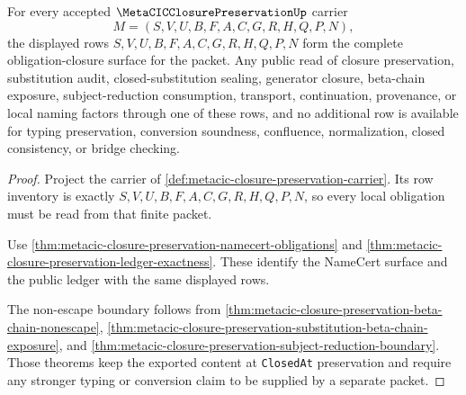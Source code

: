 \begin{theorem}
\label{thm:metacic-closure-preservation-obligation-closure}
For every accepted $\MetaCICClosurePreservationUp$ carrier
$$
M=(S,V,U,B,F,A,C,G,R,H,Q,P,N),
$$
the displayed rows $S,V,U,B,F,A,C,G,R,H,Q,P,N$ form the complete obligation-closure surface for the packet. Any public read of closure preservation, substitution audit, closed-substitution sealing, generator closure, beta-chain exposure, subject-reduction consumption, transport, continuation, provenance, or local naming factors through one of these rows, and no additional row is available for typing preservation, conversion soundness, confluence, normalization, closed consistency, or bridge checking.
\end{theorem}
\begin{proof}
Project the carrier of \autoref{def:metacic-closure-preservation-carrier}. Its row inventory is exactly $S,V,U,B,F,A,C,G,R,H,Q,P,N$, so every local obligation must be read from that finite packet.

Use \autoref{thm:metacic-closure-preservation-namecert-obligations} and \autoref{thm:metacic-closure-preservation-ledger-exactness}. These identify the NameCert surface and the public ledger with the same displayed rows.

The non-escape boundary follows from \autoref{thm:metacic-closure-preservation-beta-chain-nonescape}, \autoref{thm:metacic-closure-preservation-substitution-beta-chain-exposure}, and \autoref{thm:metacic-closure-preservation-subject-reduction-boundary}. Those theorems keep the exported content at \texttt{ClosedAt} preservation and require any stronger typing or conversion claim to be supplied by a separate packet.
\end{proof}

